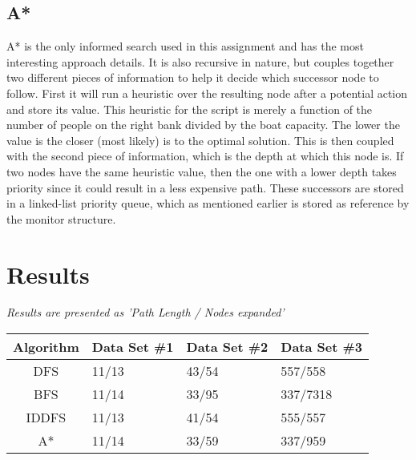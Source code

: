 \documentclass[10pt,draftclsnofoot,onecolumn]{IEEEtran}
\begin{document}
\subsection{A*}
A* is the only informed search used in this assignment and has the most interesting approach details.
It is also recursive in nature, but couples together two different pieces of information to help it decide which successor node to follow.
First it will run a heuristic over the resulting node after a potential action and store its value.
This heuristic for the script is merely a function of the number of people on the right bank divided by the boat capacity.
The lower the value is the closer (most likely) is to the optimal solution.
This is then coupled with the second piece of information, which is the depth at which this node is.
If two nodes have the same heuristic value, then the one with a lower depth takes priority since it could result in a less expensive path.
These successors are stored in a linked-list priority queue, which as mentioned earlier is stored as reference by the monitor structure.

\section{Results}

\newpage %

\begin{center}
\textit{Results are presented as  'Path Length  / Nodes expanded'} \\
\end{center}

\begin{center}
\begin{tabular}{ c l l l }
  \hline
    Algorithm & Data Set \#1 & Data Set \#2 & Data Set \#3 \\
  \hline
   DFS       & 11/13       & 43/54       & 557/558  \\
   BFS       & 11/14       & 33/95       & 337/7318 \\
   IDDFS     & 11/13       & 41/54       & 555/557  \\
   A*        & 11/14       & 33/59       & 337/959  \\
\end{tabular}
\end{center}
\end{document}
